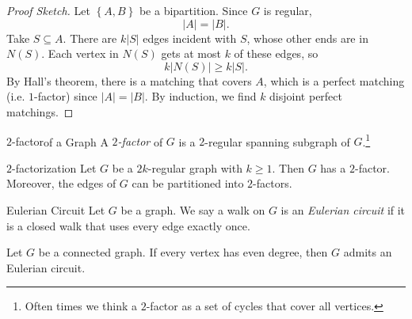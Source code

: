 \documentclass[co342]{subfiles}
\begin{document}
    \begin{proof}[Proof Sketch]
        Let $\left\lbrace A,B \right\rbrace$ be a bipartition. Since $G$ is regular,
        \begin{equation*}
            \left| A \right|=\left| B \right|.
        \end{equation*}
        Take $S\subseteq A$. There are $k\left| S \right|$ edges incident with $S$, whose other ends are in $N\left( S \right)$. Each vertex in $N\left( S \right)$ gets at most $k$ of these edges, so
        \begin{equation*}
            k\left| N\left( S \right) \right|\geq k\left| S \right|.
        \end{equation*}
        By Hall's theorem, there is a matching that covers $A$, which is a perfect matching (i.e. $1$-factor) since $\left| A \right|=\left| B \right|$. By induction, we find $k$ disjoint perfect matchings.
    \end{proof}

    \begin{definition}{$2$-factor}{of a Graph}
        A \emph{$2$-factor} of $G$ is a $2$-regular spanning subgraph of $G$.\footnote{Often times we think a $2$-factor as a set of cycles that cover all vertices.}
    \end{definition}

    \begin{prop}{$2$-factorization}
        Let $G$ be a $2k$-regular graph with $k\geq 1$. Then $G$ has a $2$-factor. Moreover, the edges of $G$ can be partitioned into $2$-factors.
    \end{prop}

    \begin{recall}{Eulerian Circuit}{}
        Let $G$ be a graph. We say a walk on $G$ is an \emph{Eulerian circuit} if it is a closed walk that uses every edge exactly once.
    \end{recall}

    \begin{prop}{}
        Let $G$ be a connected graph. If every vertex has even degree, then $G$ admits an Eulerian circuit.
    \end{prop}
\end{document}
